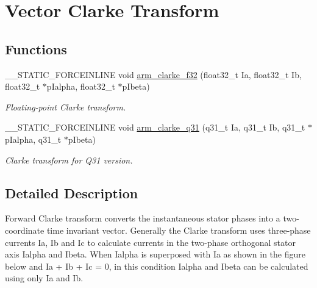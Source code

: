 \hypertarget{group__clarke}{}\section{Vector Clarke Transform}
\label{group__clarke}
\subsection*{Functions}
\begin{DoxyCompactItemize}
\item 
\+\_\+\+\_\+\+S\+T\+A\+T\+I\+C\+\_\+\+F\+O\+R\+C\+E\+I\+N\+L\+I\+NE void \mbox{\hyperlink{group__clarke_ga82d40c62bb48ef4d613f1f2f685b4084}{arm\+\_\+clarke\+\_\+f32}} (float32\+\_\+t Ia, float32\+\_\+t Ib, float32\+\_\+t $\ast$p\+Ialpha, float32\+\_\+t $\ast$p\+Ibeta)
\begin{DoxyCompactList}\small\item\em Floating-\/point Clarke transform. \end{DoxyCompactList}\item 
\+\_\+\+\_\+\+S\+T\+A\+T\+I\+C\+\_\+\+F\+O\+R\+C\+E\+I\+N\+L\+I\+NE void \mbox{\hyperlink{group__clarke_ga8d68db2a6e26e1caab677f5ab293c068}{arm\+\_\+clarke\+\_\+q31}} (q31\+\_\+t Ia, q31\+\_\+t Ib, q31\+\_\+t $\ast$p\+Ialpha, q31\+\_\+t $\ast$p\+Ibeta)
\begin{DoxyCompactList}\small\item\em Clarke transform for Q31 version. \end{DoxyCompactList}\end{DoxyCompactItemize}


\subsection{Detailed Description}
Forward Clarke transform converts the instantaneous stator phases into a two-\/coordinate time invariant vector. Generally the Clarke transform uses three-\/phase currents {\ttfamily Ia, Ib and Ic} to calculate currents in the two-\/phase orthogonal stator axis {\ttfamily Ialpha} and {\ttfamily Ibeta}. When {\ttfamily Ialpha} is superposed with {\ttfamily Ia} as shown in the figure below  and {\ttfamily Ia + Ib + Ic = 0}, in this condition {\ttfamily Ialpha} and {\ttfamily Ibeta} can be calculated using only {\ttfamily Ia} and {\ttfamily Ib}.

